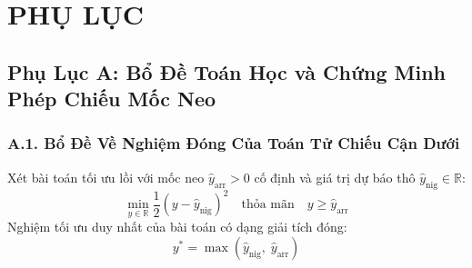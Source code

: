 \chapter*{PHỤ LỤC}
\label{ch:appendices}

\section*{Phụ Lục A: Bổ Đề Toán Học và Chứng Minh Phép Chiếu Mốc Neo}
\label{sec:appendix_proofs}

\subsection*{A.1. Bổ Đề Về Nghiệm Đóng Của Toán Tử Chiếu Cận Dưới}
\begin{lemma}
\label{lem:anchor_projection}
Xét bài toán tối ưu lồi với mốc neo $\hat{y}_{\text{arr}} > 0$ cố định và giá trị dự báo thô $\hat{y}_{\text{nig}} \in \mathbb{R}$:
\begin{equation}
    \min_{y \in \mathbb{R}} \frac{1}{2} (y - \hat{y}_{\text{nig}})^2 \quad \text{thỏa mãn} \quad y \ge \hat{y}_{\text{arr}}
\end{equation}
Nghiệm tối ưu duy nhất của bài toán có dạng giải tích đóng:
\begin{equation}
    y^* = \max\left( \hat{y}_{\text{nig}}, \; \hat{y}_{\text{arr}} \right)
\end{equation}
\end{lemma}

